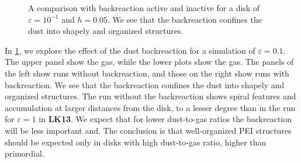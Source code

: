 \documentclass[onecolumn]{report}
\newcommand{\epsi}{\varepsilon}
\begin{document}
\begin{figure}
  \begin{center}
  \end{center}
  \caption{A comparison with backreaction active and inactive for a
    disk of $\varepsilon=10^{-1}$ and $h=0.05$. We see that the
    backreaction confines the dust into shapely and organized
    structures.}
  \label{fig:bkrk_comp}
\end{figure}  

In \ref{fig:bkrk_comp}, we explore the effect of the dust backreaction for a simulation of $\epsi=0.1$. The upper panel show the gas, while the lower plots show the gas. The panels of the left show runs without backreaction, and those on the right show runs with backreaction. We see that the backreaction confines the dust into shapely and organized structures. The run without the backreaction shows spiral features and accumulation at larger distances from the disk, to a lesser degree than in the run for $\epsi=1$ in \textbf{LK13}. We expect that for lower dust-to-gas ratios the backreaction will be less important and. The conclusion is that well-organized PEI structures should be expected only in disks with high dust-to-gas ratio, higher than primordial.
\end{document}
